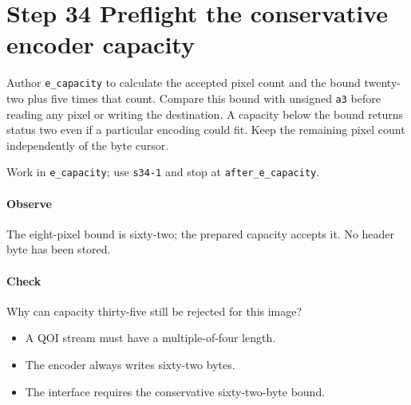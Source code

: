 \section{Step 34 Preflight the conservative encoder capacity}\label{qoi-s34}
Author \texttt{e\_capacity} to calculate the accepted pixel count and the bound twenty-two plus five times that count. Compare this bound with unsigned \texttt{a3} before reading any pixel or writing the destination. A capacity below the bound returns status two even if a particular encoding could fit. Keep the remaining pixel count independently of the byte cursor.

Work in \texttt{e\_capacity}; use \texttt{s34-1} and stop at \texttt{after\_e\_capacity}.

\paragraph{Observe} The eight-pixel bound is sixty-two; the prepared capacity accepts it. No header byte has been stored.

\paragraph{Check} Why can capacity thirty-five still be rejected for this image?
\begin{itemize}
\item[A.] A QOI stream must have a multiple-of-four length.
\item[B.] The encoder always writes sixty-two bytes.
\item[C.] The interface requires the conservative sixty-two-byte bound.
\end{itemize}
